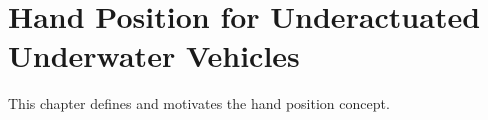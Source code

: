 \chapter{Hand Position for Underactuated Underwater Vehicles}
\label{chap:handpos_definition}

This chapter defines and motivates the hand position concept.
